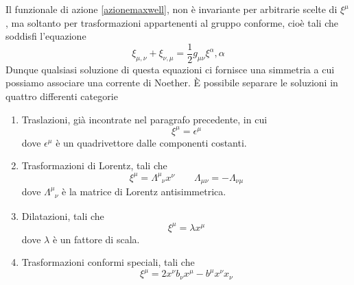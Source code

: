     Il funzionale di azione \eqref{azionemaxwell}, non è invariante per arbitrarie scelte di $\xi^\mu$, ma soltanto per trasformazioni appartenenti al gruppo conforme, cioè tali che soddisfi l'equazione
\begin{equation}\label{conforme}
    \xi_{\mu,\nu} + \xi_{\nu,\mu} = \frac{1}{2} g_{\mu\nu} \xi^\alpha{,\alpha}
\end{equation} 
    Dunque qualsiasi soluzione di questa equazioni ci fornisce una simmetria a cui possiamo associare una corrente di Noether. È possibile separare le soluzioni in quattro differenti categorie 
\begin{enumerate}
    \item Traslazioni, già incontrate nel paragrafo precedente, in cui
\begin{equation*}
    \xi^\mu = \epsilon^\mu
\end{equation*}
    dove $\epsilon^\mu$ è un quadrivettore dalle componenti costanti.
    \item Trasformazioni di Lorentz, tali che 
\begin{equation*}
    \xi^\mu = \Lambda^\mu_{\phantom \mu \nu} x^\nu \qquad \Lambda_{\mu\nu} = - \Lambda_{\nu\mu}
\end{equation*}
    dove $\Lambda^\mu_{\phantom \mu \nu}$ è la matrice di Lorentz antisimmetrica.
    \item Dilatazioni, tali che
\begin{equation*}
    \xi^\mu = \lambda x^\mu
\end{equation*}
    dove $\lambda$ è un fattore di scala.
    \item Trasformazioni conformi speciali, tali che
\begin{equation*}
    \xi^\mu = 2 x^\nu b_\nu x^\mu - b^\mu x^\nu x_\nu
\end{equation*}
\end{enumerate}

